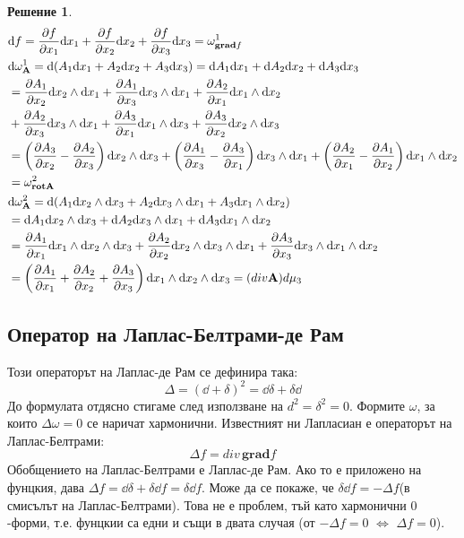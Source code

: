 \documentclass[12pt]{article}
\newtheorem*{solution*}{Решение}
\begin{document}
\begin{large}
\begin{solution*}
\begin{align*}
&\dd f = \pdv{f}{x_1} \dd x_1 + \pdv{f}{x_2} \dd x_2 + \pdv{f}{x_3} \dd x_3 = \omega_{\mathbf{grad}f}^1 \\
&\dd \omega_{\mathbf{A}}^1 = \dd (A_1 \dd x_1 + A_2 \dd x_2 + A_3 \dd x_3) = \dd A_1 \dd x_1 + \dd A_2 \dd x_2 + \dd A_3 \dd x_3 \\
&=\pdv{A_1}{x_2} \dd x_2 \wedge \dd x_1 + \pdv{A_1}{x_3} \dd x_3 \wedge \dd x_1 + \pdv{A_2}{x_1} \dd x_1 \wedge \dd x_2 \\ 
&+\pdv{A_2}{x_3} \dd x_3 \wedge \dd x_1 + \pdv{A_3}{x_1} \dd x_1 \wedge \dd x_3 + \pdv{A_3}{x_2} \dd x_2 \wedge \dd x_3 \\
&= \left(\pdv{A_3}{x_2} - \pdv{A_2}{x_3}\right) \dd x_2 \wedge \dd x_3 + \left(\pdv{A_1}{x_3} - \pdv{A_3}{x_1}\right) \dd x_3 \wedge \dd x_1 + \left(\pdv{A_2}{x_1} - \pdv{A_1}{x_2}\right) \dd x_1 \wedge \dd x_2 \\
&=\omega_{\mathbf{rot}\mathbf{A}}^2 \\
&\dd \omega_{\mathbf{A}}^2 = \dd (A_1 \dd x_2 \wedge \dd x_3 + A_2 \dd x_3 \wedge \dd x_1 + A_3 \dd x_1 \wedge \dd x_2) \\
&= \dd A_1 \dd x_2 \wedge \dd x_3 + \dd A_2 \dd x_3 \wedge \dd x_1 + \dd A_3 \dd x_1 \wedge \dd x_2 \\
&=\pdv{A_1}{x_1} \dd x_1 \wedge \dd x_2 \wedge \dd x_3 + \pdv{A_2}{x_2} \dd x_2 \wedge \dd x_3 \wedge \dd x_1 + \pdv{A_3}{x_3} \dd x_3 \wedge \dd x_1 \wedge \dd x_2 \\
&=\left(\pdv{A_1}{x_1}+\pdv{A_2}{x_2}+\pdv{A_3}{x_3}\right)\dd x_1 \wedge \dd x_2 \wedge \dd x_3 = (div \mathbf{A})d\mu_3 
\end{align*}
\end{solution*}

\subsection{Оператор на Лаплас-Белтрами-де Рам}
Този операторът на Лаплас-де Рам се дефинира така:
\[
\Delta = (\dd + \delta)^2 = \dd \delta + \delta \dd
\]
До формулата отдясно стигаме след използване на $d^2=\delta^2=0$. Формите $\omega$, за които $\Delta \omega = 0$ се наричат хармонични. 
Известният ни Лапласиан е операторът на Лаплас-Белтрами:
\[
\Delta f = div \, \mathbf{grad} f
\]
Обобщението на Лаплас-Белтрами е Лаплас-де Рам. Ако то е приложено на фунцкия, дава $\Delta f = \dd \delta + \delta \dd f = \delta \dd f$. Може да се покаже, че $\delta \dd f=-\Delta f$(в смисълът на Лаплас-Белтрами). Това не е проблем, тъй като хармонични $0$-форми, т.е. фунцкии са едни и същи в двата случая (от $-\Delta f = 0$ $\Longleftrightarrow$ $\Delta f = 0$).


\end{large}
\end{document}
